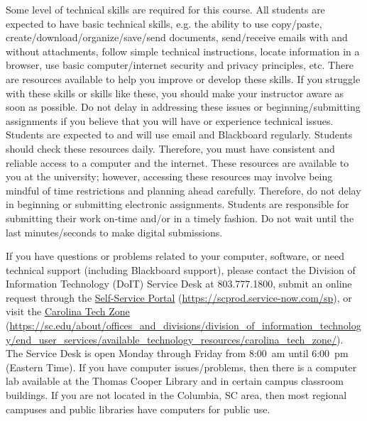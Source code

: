 \documentclass[11pt,letterpaper]{article}
\begin{document}
Some level of technical skills are required for this course. All students are expected to have basic technical skills, e.g. the ability to use copy/paste, create/download/organize/save/send documents, send/receive emails with and without attachments, follow simple technical instructions, locate information in a browser, use basic computer/internet security and privacy principles, etc. There are resources available to help you improve or develop these skills. If you struggle with these skills or skills like these, you should make your instructor aware as soon as possible. Do not delay in addressing these issues or beginning/submitting assignments if you believe that you will have or experience technical issues. Students are expected to and will use email and Blackboard regularly. Students should check these resources daily. Therefore, you must have consistent and reliable access to a computer and the internet. These resources are available to you at the university; however, accessing these resources may involve being mindful of time restrictions and planning ahead carefully. Therefore, do not delay in beginning or submitting electronic assignments. Students are responsible for submitting their work on-time and/or in a timely fashion. Do not wait until the last minutes/seconds to make digital submissions. \pspace

If you have questions or problems related to your computer, software, or need technical support (including Blackboard support), please contact the Division of Information Technology (DoIT) Service Desk at 803.777.1800, submit an online request through the \href{https://scprod.service-now.com/sp}{Self-Service Portal} (\url{https://scprod.service-now.com/sp}), or visit the \href{https://sc.edu/about/offices\_and\_divisions/division\_of\_information\_technology/end\_user\_services/available\_technology\_resources/carolina\_tech\_zone/}{Carolina Tech Zone} (\url{https://sc.edu/about/offices\_and\_divisions/division\_of\_information\_technology/end\_user\_services/available\_technology\_resources/carolina\_tech\_zone/}). The Service Desk is open Monday through Friday from 8:00~am until 6:00~pm (Eastern Time). If you have computer issues/problems, then there is a computer lab available at the Thomas Cooper Library and in certain campus classroom buildings. If you are not located in the Columbia, SC area, then most regional campuses and public libraries have computers for public use. \pspace
\end{document}
